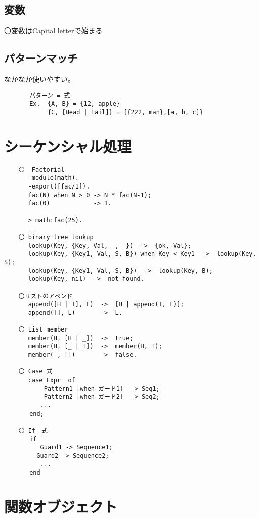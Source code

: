 \subsection{変数}

      〇変数はCapital letterで始まる\\

\subsection{パターンマッチ}

なかなか使いやすい。

\begin{verbatim}
       パターン = 式 
       Ex.  {A, B} = {12, apple}
            {C, [Head | Tail]} = {{222, man},[a, b, c]}
\end{verbatim}



\section{シーケンシャル処理}

\begin{verbatim}
    〇  Factorial
    　 -module(math).
    　 -export([fac/1]).
    　 fac(N) when N > 0 -> N * fac(N-1);
    　 fac(0)            -> 1.
    　 
    　 > math:fac(25).
    
    〇 binary tree lookup 
    　 lookup(Key, {Key, Val, _, _})  ->  {ok, Val};
    　 lookup(Key, {Key1, Val, S, B}) when Key < Key1  ->  lookup(Key, S);
    　 lookup(Key, {Key1, Val, S, B})  ->  lookup(Key, B);
    　 lookup(Key, nil)  ->  not_found.
    
    〇リストのアペンド
    　 append([H | T], L)  ->  [H | append(T, L)];
    　 append([], L)       ->  L.
    
    〇 List member 
    　 member(H, [H | _])  ->  true;
    　 member(H, [_ | T])  ->  member(H, T);
    　 member(_, [])       ->  false.

    〇 Case 式   
    　 case Expr  of
           Pattern1 [when ガード1]  -> Seq1;
           Pattern2 [when ガード2]  -> Seq2;
    　　　 ...
       end;
    
    〇 If　式
       if 
          Guard1 -> Sequence1;
    　　　Guard2 -> Sequence2;
          ...
       end
\end{verbatim}    


\section{ 関数オブジェクト}

